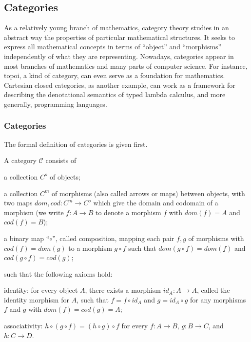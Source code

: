 \subsection{Categories}
\label{sec:bg_cat}
As a relatively young branch of mathematics, category theory studies in an abstract way the properties of particular mathematical structures. It seeks to express all mathematical concepts in terms of ``object'' and ``morphisms'' independently of what they are representing. Nowadays, categories appear in most branches of mathematics and many parts of computer science. For instance, topoi, a kind of category, can even serve as a foundation for mathematics. Cartesian closed categories, as another example, can work as a framework for describing the denotational semantics of typed lambda calculus, and more generally, programming languages.


\subsubsection{Categories}
\label{sec:bg_cat_c}
The formal definition of categories is given first.
\begin{definition}
\label{definition:category}
A category $ \mathcal{C} $ consists of
\begin{myitemize}
\item a collection $ C^o $ of objects;
\item a collection $ C^m $ of morphisms (also called arrows or maps) between objects, with two maps $ dom, cod : C^m \to C^o $ which give the domain and codomain of a morphism (we write $ f : A \to B $ to denote a morphism $ f $ with $ dom(f) = A $ and $ cod(f) = B $);
\item a binary map ``$ \circ $'', called composition, mapping each pair $ f, g $ of morphisms with $ cod(f) = dom(g) $ to a morphism $ g \circ f $ such that $ dom(g \circ f) = dom(f) $ and $ cod(g \circ f) = cod(g) $;
\end{myitemize}
such that the following axioms hold:
\begin{myitemize}
\item identity: for every object $ A $, there exists a morphism $ id_A : A \to A $, called the identity morphism for $ A $, such that $ f = f \circ id_A $ and $ g = id_A \circ g $ for any morphisms $ f $ and $ g $ with $ dom(f) = cod(g) = A $;
\item associativity: $ h \circ (g \circ f) = (h \circ g) \circ f $ for every $ f: A \to B $, $ g: B \to C$, and $ h: C \to D $.
\end{myitemize}
\end{definition}

